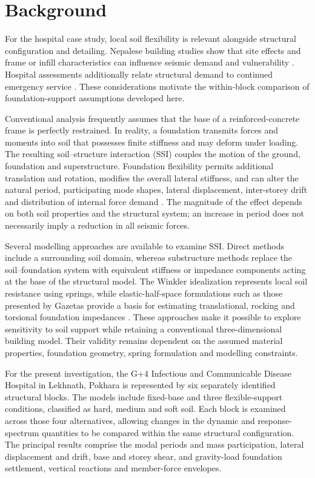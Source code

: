 \section{Background}
For the hospital case study, local soil flexibility is relevant alongside structural configuration and detailing. Nepalese building studies show that site effects and frame or infill characteristics can influence seismic demand and vulnerability \cite{gautam2016,adhikari2022}. Hospital assessments additionally relate structural demand to continued emergency service \cite{guragain2004,subedi2022}. These considerations motivate the within-block comparison of foundation-support assumptions developed here.

Conventional analysis frequently assumes that the base of a reinforced-concrete frame is perfectly restrained. In reality, a foundation transmits forces and moments into soil that possesses finite stiffness and may deform under loading. The resulting soil--structure interaction (SSI) couples the motion of the ground, foundation and superstructure. Foundation flexibility permits additional translation and rotation, modifies the overall lateral stiffness, and can alter the natural period, participating mode shapes, lateral displacement, inter-storey drift and distribution of internal force demand \cite{wolf1985,gazetas1991}. The magnitude of the effect depends on both soil properties and the structural system; an increase in period does not necessarily imply a reduction in all seismic forces.

Several modelling approaches are available to examine SSI. Direct methods include a surrounding soil domain, whereas substructure methods replace the soil--foundation system with equivalent stiffness or impedance components acting at the base of the structural model. The Winkler idealization represents local soil resistance using springs, while elastic-half-space formulations such as those presented by Gazetas provide a basis for estimating translational, rocking and torsional foundation impedances \cite{wolf1985,gazetas1991}. These approaches make it possible to explore sensitivity to soil support while retaining a conventional three-dimensional building model. Their validity remains dependent on the assumed material properties, foundation geometry, spring formulation and modelling constraints.

For the present investigation, the G+4 Infectious and Communicable Disease Hospital in Lekhnath, Pokhara is represented by six separately identified structural blocks. The models include fixed-base and three flexible-support conditions, classified as hard, medium and soft soil. Each block is examined across those four alternatives, allowing changes in the dynamic and response-spectrum quantities to be compared within the same structural configuration. The principal results comprise the modal periods and mass participation, lateral displacement and drift, base and storey shear, and gravity-load foundation settlement, vertical reactions and member-force envelopes.

